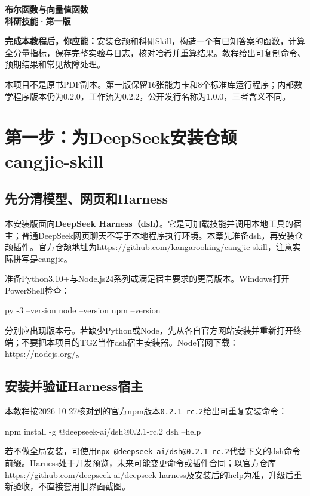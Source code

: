 \documentclass[UTF8,fontset=fandol,zihao=-4]{ctexrep}
\begin{document}
\begin{titlepage}\centering\vspace*{18mm}
{\Huge\bfseries\color{ink}布尔函数与向量值函数\\科研技能·第一版\par}
\vspace{12mm}{\LARGE DeepSeek Harness 安装与使用教程\par}
\vspace{8mm}{\Large 从安装仓颉到科研复现\par}
\vspace{14mm}{\large 公开版本：V1 / 1.0.0\\冻结开发基线：0.2.2\\2026年10月27日\par}
\vfill\begin{minipage}{0.86\textwidth}
\textbf{完成本教程后，你应能：}安装仓颉和科研Skill，构造一个有已知答案的函数，计算全分量指标，保存完整实验与日志，核对哈希并重算结果。教程给出可复制命令、预期结果和常见故障处理。

本项目不是原书PDF副本。第一版保留16张能力卡和8个标准库运行程序；内部数学程序版本仍为0.2.0，工作流为0.2.2，公开发行名称为1.0.0，三者含义不同。
\end{minipage}\vspace*{10mm}
\end{titlepage}
\tableofcontents\clearpage

\chapter{第一步：为DeepSeek安装仓颉 cangjie-skill}
\section{先分清模型、网页和Harness}
本安装版面向\textbf{DeepSeek Harness（dsh）}。它是可加载技能并调用本地工具的宿主；普通DeepSeek网页聊天不等于本地程序执行环境。本章先准备dsh，再安装仓颉插件。官方仓颉地址为\url{https://github.com/kangarooking/cangjie-skill}，注意实际拼写是cangjie。

准备Python3.10+与Node.js24系列或满足宿主要求的更高版本。Windows打开PowerShell检查：
\begin{code}
py -3 --version
node --version
npm --version
\end{code}
分别应出现版本号。若缺少Python或Node，先从各自官方网站安装并重新打开终端；不要把本项目的TGZ当作dsh宿主安装器。Node官网下载：\url{https://nodejs.org/}。

\section{安装并验证Harness宿主}
本教程按2026-10-27核对到的官方npm版本\texttt{0.2.1-rc.2}给出可重复安装命令：
\begin{code}
npm install -g @deepseek-ai/dsh@0.2.1-rc.2
dsh --help
\end{code}
若不做全局安装，可使用\texttt{npx @deepseek-ai/dsh@0.2.1-rc.2}代替下文的dsh命令前缀。Harness处于开发预览，未来可能变更命令或插件合同；以官方仓库\url{https://github.com/deepseek-ai/deepseek-harness}及安装后的help为准，升级后重新验收，不直接套用旧界面截图。
\end{document}
